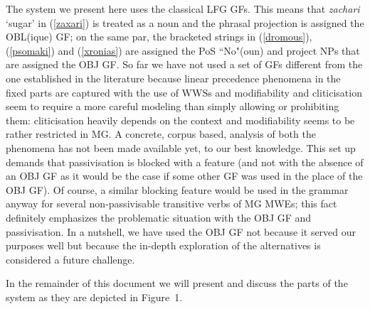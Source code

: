 \documentclass[output=paper,
modfonts
]{langscibook}
\begin{document}
The system we present here uses the classical LFG GFs. This means that \textit{zachari} `sugar' in (\ref{zaxari}) is treated as a noun and the phrasal projection is assigned the OBL(ique) GF; on the same par, the bracketed strings in (\ref{dromous}), (\ref{psomaki}) and (\ref{xronias}) are assigned the PoS ``No"(oun) and project NPs that are assigned the OBJ GF. So far we have not used a set of GFs different from the one established in the literature because linear precedence phenomena in the fixed parts are captured with the use of WWSs and modifiability and cliticisation seem to require a more careful modeling than simply allowing or prohibiting them: cliticisation heavily depends on the context and modifiability seems to be rather restricted in MG.  A concrete, corpus based, analysis of both the phenomena has not been made available yet, to our best knowledge. This set up demands that passivisation is blocked with a feature (and not with the absence of an OBJ GF as it would be the case if some other GF was used in the place of the OBJ GF). Of course, a similar blocking feature would be used in the grammar anyway for several non-passivisable transitive verbs of MG MWEs; this fact definitely emphasizes the problematic situation with the OBJ GF and passivisation. In a nutshell, we have used the OBJ GF not because it served our purposes well but because the in-depth exploration of the alternatives is considered a future challenge.

In the remainder of this document we will present and discuss the parts of the system as they are depicted in Figure~1. 
\end{document}
